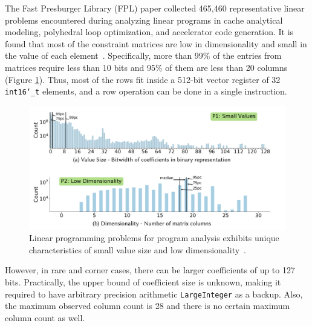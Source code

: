\documentclass[logo,bsc,singlespacing,parskip]{infthesis}
\newcommand{\dtshort}{\texttt{int16\char`_t}}
\begin{document}
The Fast Presburger Library (FPL) paper collected 465,460 representative linear
problems encountered during analyzing linear programs in cache analytical
modeling, polyhedral loop optimization, and accelerator code generation. It is
found that most of the constraint matrices are low in dimensionality and small
in the value of each element~\cite{FPL1}. Specifically, more than 99\% of the
entries from matrices require less than 10 bits and 95\% of them are less than 20 columns
(Figure \ref{small-val-low-dim}). Thus, most of the rows fit inside a 512-bit
vector register of 32 \dtshort{} elements, and a row operation can be done in a
single instruction. 


\begin{figure}
    \begin{center}
    \includegraphics[width=\linewidth]{image/small-val-low-dim.png}
    \caption{Linear programming problems for program analysis exhibits unique
    characteristics of small value size and low dimensionality~\cite{FPL1}.}
    \label{small-val-low-dim}
    \end{center}
\end{figure}


However, in rare and corner cases, there can be larger coefficients of up to 127
bits. Practically, the upper bound of coefficient size is unknown, making it
required to have arbitrary precision arithmetic \texttt{LargeInteger} as a
backup. Also, the maximum observed column count is 28 and there is no certain
maximum column count as well. 
\end{document}
